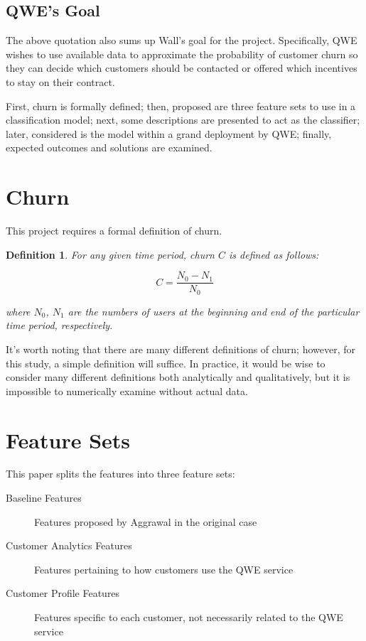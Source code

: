 \documentclass{article}
\newtheorem{Def}{Definition}
\begin{document}
	\subsection{QWE's Goal}
	
	The above quotation also sums up Wall's goal for the project. Specifically, QWE wishes to use available data to approximate the probability of customer churn so they can decide which customers should be contacted or offered which incentives to stay on their contract.
	
	First, churn is formally defined; then, proposed are three feature sets to use in a classification model; next, some descriptions are presented to act as the classifier; later, considered is the model within a grand deployment by QWE; finally, expected outcomes and solutions are examined.
	
	\section{Churn}
	
	This project requires a formal definition of churn.
	
	\begin{Def}
		\label{ChurnDefinition}
		For any given time period, churn $C$ is defined as follows:
		
		$$C = \frac{N_0 - N_1}{N_0}$$
		
		where $N_0$, $N_1$ are the numbers of users at the beginning and end of the particular time period, respectively.
	\end{Def}

	It's worth noting that there are many different definitions of churn; however, for this study, a simple definition will suffice. In practice, it would be wise to consider many different definitions both analytically and qualitatively, but it is impossible to numerically examine without actual data.
	
	\section{Feature Sets}
	
	This paper splits the features into three feature sets:
	
	\begin{description}
		\item[Baseline Features] Features proposed by Aggrawal in the original case
		\item[Customer Analytics Features] Features pertaining to how customers use the QWE service
		\item[Customer Profile Features] Features specific to each customer, not necessarily related to the QWE service
	\end{description}
\end{document}
